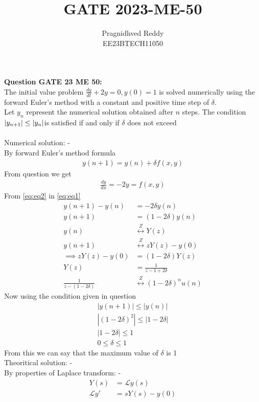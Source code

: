 \documentclass[journal,12pt,twocolumn]{IEEEtran}
\title{GATE 2023-ME-50}
\author{Pragnidhved Reddy\\EE23BTECH11050}
\date{}
\begin{document}
\maketitle
\newpage
\bigskip
\textbf{Question GATE 23 ME 50:}\\
The initial value problem
$\frac{dy}{dt}+2y=0, y(0)=1 $
is solved numerically using the forward Euler's method with a constant and positive time step of $\delta $.\\
Let $y_n$ represent the numerical solution obtained after $n$ steps. The condition $\left\vert y_{n+1}\right\vert \leq \left\vert y_n\right\vert$is satisfied if and only if $\delta$ does not exceed\\
\solution \\
Numerical solution: -\\
By forward Euler's method formula 
\begin{align}
\label{eq:eq1}
    y(n+1)=y(n)+\delta  f(x,y)
\end{align}
From question we get
\begin{align}
\label{eq:eq2}
\frac{dy}{dx}=-2y=f(x,y)
\end{align}
From \eqref{eq:eq2} in \eqref{eq:eq1}
\begin{align}
y(n+1)-y(n)&=-2\delta y(n)\\
y(n+1)&=(1-2\delta)y(n)\\
y(n)&\overset{Z}\longleftrightarrow Y(z)\\
y(n+1)&\overset{Z}\longleftrightarrow zY(z)-y(0)\\
\implies zY(z)-y(0)&=(1-2\delta)Y(z)\\
Y(z)&=\frac{1}{z-1+2\delta}\\
\frac{1}{z-(1-2\delta)}&\overset{Z}\longleftrightarrow (1-2\delta)^{n}u(n)
\end{align}
Now using the condition given in question
\begin{align}
|y(n+1)| \leq |y(n)|\\
|(1-2\delta)^2| \leq |1-2\delta|\\
|1-2\delta| \leq 1 \\
0 \leq \delta \leq 1
\end{align}
From this we can say that the maximum value of $\delta  $ is 1\\
Theoritical solution: -\\
By properties of Laplace transform: -
\begin{align}
\label{eq:eq8}
Y(s)&=\mathcal{L}y(s)\\
\label{eq:eq9}
\mathcal{L}y'&=sY(s)-y(0)
\end{align}
\end{document}
